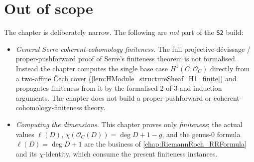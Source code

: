 \section{Out of scope}

The chapter is deliberately narrow. The following are \emph{not} part of
the \texttt{S2} build:
\begin{itemize}
  \item \emph{General Serre coherent-cohomology finiteness.} The full
    projective-dévissage / proper-pushforward proof of Serre's
    finiteness theorem is not formalised. Instead the chapter computes
    the single base case \(H^1(C, \mathcal O_C)\) directly from a
    two-affine Čech cover (\cref{lem:HModule_structureSheaf_H1_finite})
    and propagates finiteness from it by the formalised 2-of-3 and
    induction arguments. The chapter does not build a proper-pushforward
    or coherent-cohomology-finiteness theory.
  \item \emph{Computing the dimensions.} This chapter proves only
    \emph{finiteness}; the actual values \(\ell(D)\), \(\chi(\mathcal
    O_C(D)) = \deg D + 1 - g\), and the genus-\(0\) formula
    \(\ell(D) = \deg D + 1\) are the business of
    \cref{chap:RiemannRoch_RRFormula} and its
    \(\chi\)-identity, which consume the present finiteness instances.
\end{itemize}
